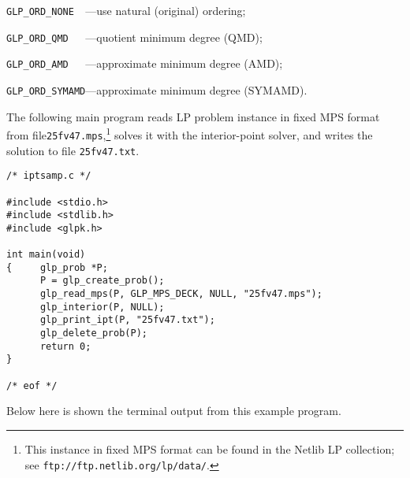 \verb|GLP_ORD_NONE  |---use natural (original) ordering;

\verb|GLP_ORD_QMD   |---quotient minimum degree (QMD);

\verb|GLP_ORD_AMD   |---approximate minimum degree (AMD);

\verb|GLP_ORD_SYMAMD|---approximate minimum degree (SYMAMD).

\bigskip


The following main program reads LP problem instance in fixed MPS
format from file\linebreak \verb|25fv47.mps|,\footnote{This instance in
fixed MPS format can be found in the Netlib LP collection; see
{\tt ftp://ftp.netlib.org/lp/data/}.} solves it with the interior-point
solver, and writes the solution to file \verb|25fv47.txt|.

\begin{footnotesize}
\begin{verbatim}
/* iptsamp.c */

#include <stdio.h>
#include <stdlib.h>
#include <glpk.h>

int main(void)
{     glp_prob *P;
      P = glp_create_prob();
      glp_read_mps(P, GLP_MPS_DECK, NULL, "25fv47.mps");
      glp_interior(P, NULL);
      glp_print_ipt(P, "25fv47.txt");
      glp_delete_prob(P);
      return 0;
}

/* eof */
\end{verbatim}
\end{footnotesize}

\newpage

Below here is shown the terminal output from this example program.

